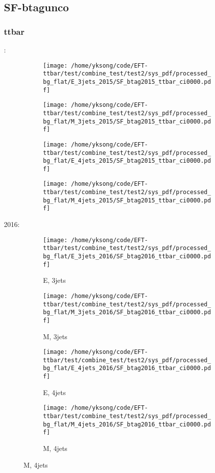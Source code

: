 \documentclass{beamer}
\begin{document}
\subsection{SF-btagunco}

\begin{frame}
\frametitle{ttbar}
\fontsize{5}{1}:
\begin{figure}
\centering
\begin{subfigure}[b]{0.24\textwidth}
\texttt{[image: /home/yksong/code/EFT-ttbar/test/combine\_test/test2/sys\_pdf/processed\_bg\_flat/E\_3jets\_2015/SF\_btag2015\_ttbar\_ci0000.pdf]}
\end{subfigure}
\begin{subfigure}[b]{0.24\textwidth}
\texttt{[image: /home/yksong/code/EFT-ttbar/test/combine\_test/test2/sys\_pdf/processed\_bg\_flat/M\_3jets\_2015/SF\_btag2015\_ttbar\_ci0000.pdf]}
\end{subfigure}
\begin{subfigure}[b]{0.24\textwidth}
\texttt{[image: /home/yksong/code/EFT-ttbar/test/combine\_test/test2/sys\_pdf/processed\_bg\_flat/E\_4jets\_2015/SF\_btag2015\_ttbar\_ci0000.pdf]}
\end{subfigure}
\begin{subfigure}[b]{0.24\textwidth}
\texttt{[image: /home/yksong/code/EFT-ttbar/test/combine\_test/test2/sys\_pdf/processed\_bg\_flat/M\_4jets\_2015/SF\_btag2015\_ttbar\_ci0000.pdf]}
\end{subfigure}
\end{figure}
2016:
\begin{figure}
\centering
\begin{subfigure}[b]{0.24\textwidth}
\texttt{[image: /home/yksong/code/EFT-ttbar/test/combine\_test/test2/sys\_pdf/processed\_bg\_flat/E\_3jets\_2016/SF\_btag2016\_ttbar\_ci0000.pdf]}
\captionsetup{font=tiny}
\caption{E, 3jets}
\end{subfigure}
\begin{subfigure}[b]{0.24\textwidth}
\texttt{[image: /home/yksong/code/EFT-ttbar/test/combine\_test/test2/sys\_pdf/processed\_bg\_flat/M\_3jets\_2016/SF\_btag2016\_ttbar\_ci0000.pdf]}
\captionsetup{font=tiny}
\caption{M, 3jets}
\end{subfigure}
\begin{subfigure}[b]{0.24\textwidth}
\texttt{[image: /home/yksong/code/EFT-ttbar/test/combine\_test/test2/sys\_pdf/processed\_bg\_flat/E\_4jets\_2016/SF\_btag2016\_ttbar\_ci0000.pdf]}
\captionsetup{font=tiny}
\caption{E, 4jets}
\end{subfigure}
\begin{subfigure}[b]{0.24\textwidth}
\texttt{[image: /home/yksong/code/EFT-ttbar/test/combine\_test/test2/sys\_pdf/processed\_bg\_flat/M\_4jets\_2016/SF\_btag2016\_ttbar\_ci0000.pdf]}
\captionsetup{font=tiny}
\caption{M, 4jets}
\end{subfigure}
\end{figure}
\end{frame}
\end{document}
